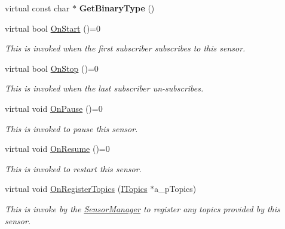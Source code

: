 \begin{DoxyCompactItemize}
\item 
\mbox{\label{class_i_sensor_a8ce1f068ca952120c6dd2c9a44f9bf12}} 
virtual const char $\ast$ {\bfseries Get\+Binary\+Type} ()
\item 
\mbox{\label{class_i_sensor_af4528b6b0cbccc71fefc06962fe59dca}} 
virtual bool \hyperlink{class_i_sensor_af4528b6b0cbccc71fefc06962fe59dca}{On\+Start} ()=0
\begin{DoxyCompactList}\small\item\em This is invoked when the first subscriber subscribes to this sensor. \end{DoxyCompactList}\item 
\mbox{\label{class_i_sensor_aff54fa470b6873502b2f41b34a3f38cb}} 
virtual bool \hyperlink{class_i_sensor_aff54fa470b6873502b2f41b34a3f38cb}{On\+Stop} ()=0
\begin{DoxyCompactList}\small\item\em This is invoked when the last subscriber un-\/subscribes. \end{DoxyCompactList}\item 
\mbox{\label{class_i_sensor_aaca0902bbff9f0b1f0e371b1cabbe9fe}} 
virtual void \hyperlink{class_i_sensor_aaca0902bbff9f0b1f0e371b1cabbe9fe}{On\+Pause} ()=0
\begin{DoxyCompactList}\small\item\em This is invoked to pause this sensor. \end{DoxyCompactList}\item 
\mbox{\label{class_i_sensor_a938e06f4c6eb85ef2b4b737d905be960}} 
virtual void \hyperlink{class_i_sensor_a938e06f4c6eb85ef2b4b737d905be960}{On\+Resume} ()=0
\begin{DoxyCompactList}\small\item\em This is invoked to restart this sensor. \end{DoxyCompactList}\item 
\mbox{\label{class_i_sensor_aa5badbc820f0e8dba39ebd35ed577fc8}} 
virtual void \hyperlink{class_i_sensor_aa5badbc820f0e8dba39ebd35ed577fc8}{On\+Register\+Topics} (\hyperlink{class_i_topics}{I\+Topics} $\ast$a\+\_\+p\+Topics)
\begin{DoxyCompactList}\small\item\em This is invoke by the \hyperlink{class_sensor_manager}{Sensor\+Manager} to register any topics provided by this sensor. \end{DoxyCompactList}\item 

\end{DoxyCompactItemize}
